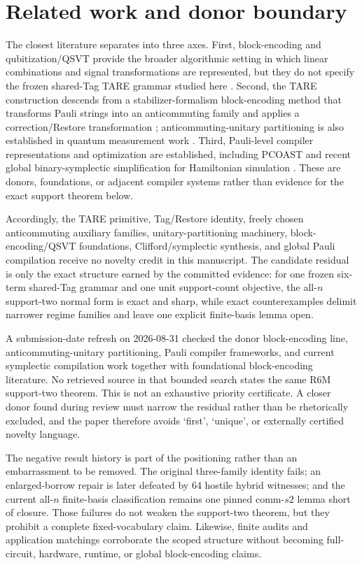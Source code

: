 \section{Related work and donor boundary}

The closest literature separates into three axes. First, block-encoding and qubitization/QSVT provide the broader algorithmic setting in which linear combinations and signal transformations are represented, but they do not specify the frozen shared-Tag TARE grammar studied here \cite{low2019qubitization,gilyen2019qsvt}. Second, the TARE construction descends from a stabilizer-formalism block-encoding method that transforms Pauli strings into an anticommuting family and applies a correction/Restore transformation \cite{schillo2026blockencoding}; anticommuting-unitary partitioning is also established in quantum measurement work \cite{izmaylov2020unitary}. Third, Pauli-level compiler representations and optimization are established, including PCOAST \cite{paykin2023pcoast} and recent global binary-symplectic simplification for Hamiltonian simulation \cite{yang2026symphony}. These are donors, foundations, or adjacent compiler systems rather than evidence for the exact support theorem below.

Accordingly, the TARE primitive, Tag/Restore identity, freely chosen anticommuting auxiliary families, unitary-partitioning machinery, block-encoding/QSVT foundations, Clifford/symplectic synthesis, and global Pauli compilation receive no novelty credit in this manuscript. The candidate residual is only the exact structure earned by the committed evidence: for one frozen six-term shared-Tag grammar and one unit support-count objective, the all-$n$ support-two normal form is exact and sharp, while exact counterexamples delimit narrower regime families and leave one explicit finite-basis lemma open.

A submission-date refresh on 2026-08-31 checked the donor block-encoding line, anticommuting-unitary partitioning, Pauli compiler frameworks, and current symplectic compilation work together with foundational block-encoding literature. No retrieved source in that bounded search states the same R6M support-two theorem. This is not an exhaustive priority certificate. A closer donor found during review must narrow the residual rather than be rhetorically excluded, and the paper therefore avoids `first', `unique', or externally certified novelty language.

The negative result history is part of the positioning rather than an embarrassment to be removed. The original three-family identity fails; an enlarged-borrow repair is later defeated by 64 hostile hybrid witnesses; and the current all-$n$ finite-basis classification remains one pinned comm-$s2$ lemma short of closure. Those failures do not weaken the support-two theorem, but they prohibit a complete fixed-vocabulary claim. Likewise, finite audits and application matchings corroborate the scoped structure without becoming full-circuit, hardware, runtime, or global block-encoding claims.